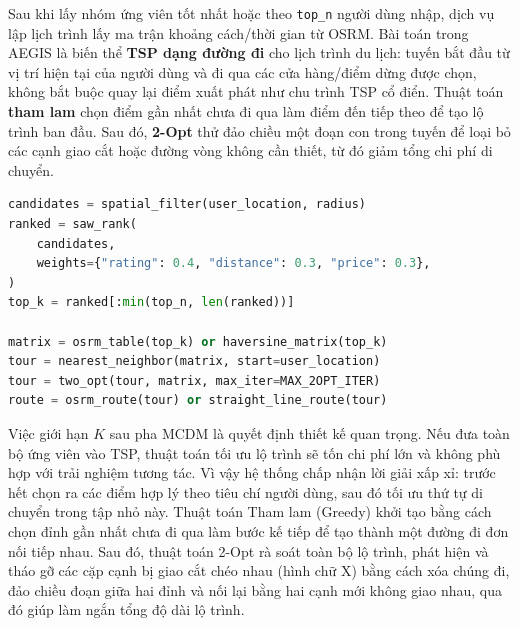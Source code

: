\documentclass[12pt, a4paper]{article}
\begin{document}
Sau khi lấy nhóm ứng viên tốt nhất hoặc theo \texttt{top\_n} người dùng nhập, dịch vụ lập lịch trình lấy ma trận khoảng cách/thời gian từ OSRM. Bài toán trong AEGIS là biến thể \textbf{TSP dạng đường đi} cho lịch trình du lịch: tuyến bắt đầu từ vị trí hiện tại của người dùng và đi qua các cửa hàng/điểm dừng được chọn, không bắt buộc quay lại điểm xuất phát như chu trình TSP cổ điển. Thuật toán \textbf{tham lam} chọn điểm gần nhất chưa đi qua làm điểm đến tiếp theo để tạo lộ trình ban đầu. Sau đó, \textbf{2-Opt} thử đảo chiều một đoạn con trong tuyến để loại bỏ các cạnh giao cắt hoặc đường vòng không cần thiết, từ đó giảm tổng chi phí di chuyển.

\begin{lstlisting}[language=Python, caption={Quy trình xếp hạng và tối ưu lộ trình}]
candidates = spatial_filter(user_location, radius)
ranked = saw_rank(
    candidates,
    weights={"rating": 0.4, "distance": 0.3, "price": 0.3},
)
top_k = ranked[:min(top_n, len(ranked))]

matrix = osrm_table(top_k) or haversine_matrix(top_k)
tour = nearest_neighbor(matrix, start=user_location)
tour = two_opt(tour, matrix, max_iter=MAX_2OPT_ITER)
route = osrm_route(tour) or straight_line_route(tour)
\end{lstlisting}

Việc giới hạn $K$ sau pha MCDM là quyết định thiết kế quan trọng. Nếu đưa toàn bộ ứng viên vào TSP, thuật toán tối ưu lộ trình sẽ tốn chi phí lớn và không phù hợp với trải nghiệm tương tác. Vì vậy hệ thống chấp nhận lời giải xấp xỉ: trước hết chọn ra các điểm hợp lý theo tiêu chí người dùng, sau đó tối ưu thứ tự di chuyển trong tập nhỏ này. Thuật toán Tham lam (Greedy) khởi tạo bằng cách chọn đỉnh gần nhất chưa đi qua làm bước kế tiếp để tạo thành một đường đi đơn nối tiếp nhau. Sau đó, thuật toán 2-Opt rà soát toàn bộ lộ trình, phát hiện và tháo gỡ các cặp cạnh bị giao cắt chéo nhau (hình chữ X) bằng cách xóa chúng đi, đảo chiều đoạn giữa hai đỉnh và nối lại bằng hai cạnh mới không giao nhau, qua đó giúp làm ngắn tổng độ dài lộ trình.
\end{document}
